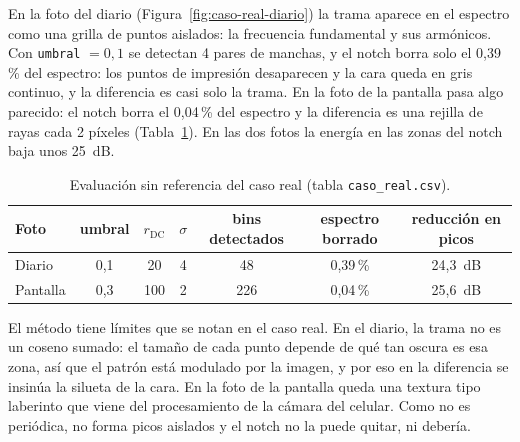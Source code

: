 
En la foto del diario (Figura~\ref{fig:caso-real-diario}) la trama aparece en el espectro como una
grilla de puntos aislados: la frecuencia fundamental y sus armónicos. Con \texttt{umbral} $=0{,}1$
se detectan 4 pares de manchas, y el notch borra solo el 0{,}39\,\% del espectro: los puntos de
impresión desaparecen y la cara queda en gris continuo, y la diferencia es casi solo la trama. En
la foto de la pantalla pasa algo parecido: el notch borra el
0{,}04\,\% del espectro y la diferencia es una rejilla de rayas cada 2 píxeles
(Tabla~\ref{tab:caso-real}). En las dos fotos la energía en las zonas del notch baja unos 25~dB.

\begin{table}[htbp]
  \centering
  \small
  \begin{tabular}{lcccccc}
    \toprule
    Foto & umbral & $r_{\text{DC}}$ & $\sigma$ & bins detectados & espectro borrado & reducción en picos \\
    \midrule
    Diario   & 0{,}1 & 20  & 4 & 48  & 0{,}39\,\% & 24{,}3~dB \\
    Pantalla & 0{,}3 & 100 & 2 & 226 & 0{,}04\,\% & 25{,}6~dB \\
    \bottomrule
  \end{tabular}
  \caption{Evaluación sin referencia del caso real (tabla \texttt{caso\_real.csv}).}
  \label{tab:caso-real}
\end{table}

El método tiene límites que se notan en el caso real. En el diario, la trama no es un coseno
sumado: el tamaño de cada punto depende de qué tan oscura es esa zona, así que el patrón está
modulado por la imagen, y por eso en la diferencia se insinúa la silueta de la cara. En la foto de la pantalla queda una textura tipo laberinto que viene del
procesamiento de la cámara del celular. Como no es periódica, no forma picos aislados y el notch
no la puede quitar, ni debería.